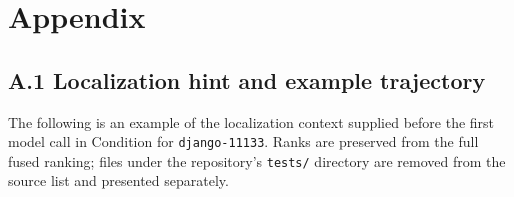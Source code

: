 \section*{Appendix}

\subsection*{A.1 Localization hint and example trajectory}

The following is an example of the localization context supplied before the first model call in Condition \condC{} for \texttt{django-11133}. Ranks are preserved from the full fused ranking; files under the repository's \texttt{tests/} directory are removed from the source list and presented separately.

